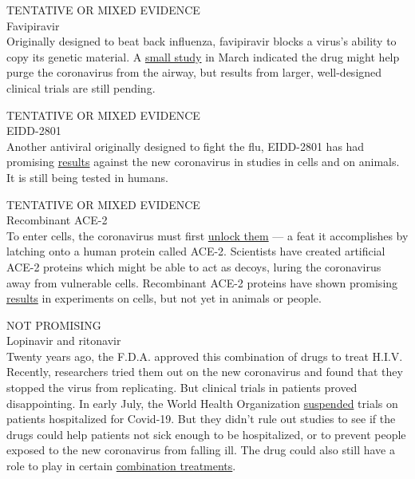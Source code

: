 TENTATIVE OR MIXED EVIDENCE\\
Favipiravir\\
Originally designed to beat back influenza, favipiravir blocks a virus's
ability to copy its genetic material. A
\href{https://www.sciencedirect.com/science/article/pii/S2095809920300631?via\%3Dihub}{small
study} in March indicated the drug might help purge the coronavirus from
the airway, but results from larger, well-designed clinical trials are
still pending.

TENTATIVE OR MIXED EVIDENCE\\
EIDD-2801\\
Another antiviral originally designed to fight the flu, EIDD-2801 has
had promising
\href{https://stm.sciencemag.org/content/12/541/eabb5883}{results}
against the new coronavirus in studies in cells and on animals. It is
still being tested in humans.

TENTATIVE OR MIXED EVIDENCE\\
Recombinant ACE-2\\
To enter cells, the coronavirus must first
\href{https://www.nytimes3xbfgragh.onion/interactive/2020/03/11/science/how-coronavirus-hijacks-your-cells.html}{unlock
them} --- a feat it accomplishes by latching onto a human protein called
ACE-2. Scientists have created artificial ACE-2 proteins which might be
able to act as decoys, luring the coronavirus away from vulnerable
cells. Recombinant ACE-2 proteins have shown promising
\href{https://doi.org/10.1016/j.cell.2020.04.004}{results} in
experiments on cells, but not yet in animals or people.

NOT PROMISING\\
Lopinavir and ritonavir\\
Twenty years ago, the F.D.A. approved this combination of drugs to treat
H.I.V. Recently, researchers tried them out on the new coronavirus and
found that they stopped the virus from replicating. But clinical trials
in patients proved disappointing. In early July, the World Health
Organization
\href{https://www.who.int/news-room/detail/04-07-2020-who-discontinues-hydroxychloroquine-and-lopinavir-ritonavir-treatment-arms-for-covid-19}{suspended}
trials on patients hospitalized for Covid-19. But they didn't rule out
studies to see if the drugs could help patients not sick enough to be
hospitalized, or to prevent people exposed to the new coronavirus from
falling ill. The drug could also still have a role to play in certain
\href{https://www.thelancet.com/journals/lancet/article/PIIS0140-6736(20)31042-4/fulltext}{combination
treatments}.


